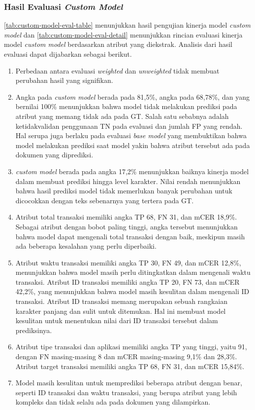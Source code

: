\subsubsection{Hasil Evaluasi \emph{Custom Model}}
\label{subsubsec:hasil-evaluasi-custom-model}
\autoref{tab:custom-model-eval-table} menunjukkan hasil pengujian kinerja model \emph{custom model} dan \autoref{tab:custom-model-eval-detail} menunjukkan rincian evaluasi kinerja model \emph{custom model} berdasarkan atribut yang diekstrak. Analisis dari hasil evaluasi dapat dijabarkan sebagai berikut.
\begin{enumerate}
    \item Perbedaan antara evaluasi \emph{weighted} dan \emph{unweighted} tidak membuat perubahan hasil yang signifikan.
    \item Angka \fscore{} pada \emph{custom model} berada pada 81,5\%, angka \recall{} pada 68,78\%, dan \precision{} yang bernilai 100\% menunjukkan bahwa model tidak melakukan prediksi pada atribut yang memang tidak ada pada GT. Salah satu sebabnya adalah ketidakvalidan penggunaan TN pada evaluasi dan jumlah FP yang rendah. Hal serupa juga berlaku pada evaluasi \emph{base model} yang membuktikan bahwa model \donut{} melakukan prediksi saat model yakin bahwa atribut tersebut ada pada dokumen yang diprediksi.
    \item \mcer{} \emph{custom model} berada pada angka 17,2\% menunjukkan baiknya kinerja model dalam membuat prediksi hingga level karakter. Nilai \mcer{} rendah menunjukkan bahwa hasil prediksi model tidak memerlukan banyak perubahan untuk dicocokkan dengan teks sebenarnya yang tertera pada GT.
    \item Atribut total transaksi memiliki angka TP 68, FN 31, dan mCER 18,9\%. Sebagai atribut dengan bobot paling tinggi, angka tersebut menunjukkan bahwa model dapat mengenali total transaksi dengan baik, meskipun masih ada beberapa kesalahan yang perlu diperbaiki.
    \item Atribut waktu transaksi memiliki angka TP 30, FN 49, dan mCER 12,8\%, menunjukkan bahwa model masih perlu ditingkatkan dalam mengenali waktu transaksi. Atribut ID transaksi memiliki angka TP 20, FN 73, dan mCER 42,2\%, yang menunjukkan bahwa model masih kesulitan dalam mengenali ID transaksi. Atribut ID transaksi memang merupakan sebuah rangkaian karakter panjang dan sulit untuk ditemukan. Hal ini membuat model kesulitan untuk menentukan nilai dari ID transaksi tersebut dalam prediksinya.
    \item Atribut tipe transaksi dan aplikasi memiliki angka TP yang tinggi, yaitu 91, dengan FN masing-masing 8 dan mCER masing-masing 9,1\% dan 28,3\%. Atribut target transaksi memiliki angka TP 68, FN 31, dan mCER 15,84\%. 
    \item Model masih kesulitan untuk memprediksi beberapa atribut dengan benar, seperti ID transaksi dan waktu transaksi, yang berupa atribut yang lebih kompleks dan tidak selalu ada pada dokumen yang dilampirkan.
\end{enumerate}
        
